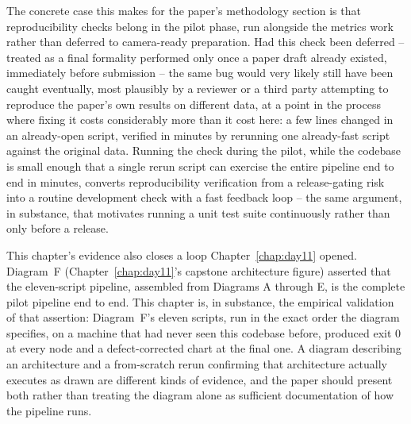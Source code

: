 The concrete case this makes for the paper's methodology section is that reproducibility checks
belong in the pilot phase, run alongside the metrics work rather than deferred to camera-ready
preparation. Had this check been deferred -- treated as a final formality performed only once a
paper draft already existed, immediately before submission -- the same bug would very likely still
have been caught eventually, most plausibly by a reviewer or a third party attempting to reproduce
the paper's own results on different data, at a point in the process where fixing it costs
considerably more than it cost here: a few lines changed in an already-open script, verified in
minutes by rerunning one already-fast script against the original data. Running the check during the
pilot, while the codebase is small enough that a single rerun script can exercise the entire
pipeline end to end in minutes, converts reproducibility verification from a release-gating risk into
a routine development check with a fast feedback loop -- the same argument, in substance, that
motivates running a unit test suite continuously rather than only before a release.

This chapter's evidence also closes a loop Chapter~\ref{chap:day11} opened. Diagram~F
(Chapter~\ref{chap:day11}'s capstone architecture figure) asserted that the eleven-script pipeline,
assembled from Diagrams A through E, is the complete pilot pipeline end to end. This chapter is, in
substance, the empirical validation of that assertion: Diagram~F's eleven scripts, run in the exact
order the diagram specifies, on a machine that had never seen this codebase before, produced exit 0
at every node and a defect-corrected chart at the final one. A diagram describing an architecture and
a from-scratch rerun confirming that architecture actually executes as drawn are different kinds of
evidence, and the paper should present both rather than treating the diagram alone as sufficient
documentation of how the pipeline runs.
